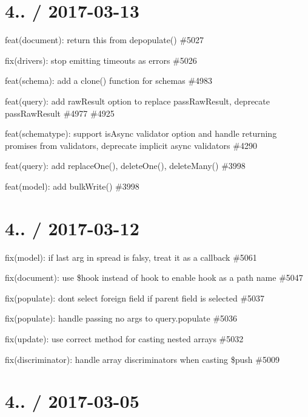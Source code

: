 \section*{4.. / 2017-\/03-\/13 }


\begin{DoxyItemize}
\item feat(document)\+: return this from {\ttfamily depopulate()} \#5027
\item fix(drivers)\+: stop emitting timeouts as errors \#5026
\item feat(schema)\+: add a clone() function for schemas \#4983
\item feat(query)\+: add raw\+Result option to replace pass\+Raw\+Result, deprecate pass\+Raw\+Result \#4977 \#4925
\item feat(schematype)\+: support is\+Async validator option and handle returning promises from validators, deprecate implicit async validators \#4290
\item feat(query)\+: add {\ttfamily replace\+One()}, {\ttfamily delete\+One()}, {\ttfamily delete\+Many()} \#3998
\item feat(model)\+: add {\ttfamily bulk\+Write()} \#3998
\end{DoxyItemize}

\section*{4.. / 2017-\/03-\/12 }


\begin{DoxyItemize}
\item fix(model)\+: if last arg in spread is falsy, treat it as a callback \#5061
\item fix(document)\+: use \$hook instead of hook to enable \textquotesingle{}hook\textquotesingle{} as a path name \#5047
\item fix(populate)\+: dont select foreign field if parent field is selected \#5037
\item fix(populate)\+: handle passing no args to query.\+populate \#5036
\item fix(update)\+: use correct method for casting nested arrays \#5032
\item fix(discriminator)\+: handle array discriminators when casting \$push \#5009
\end{DoxyItemize}

\section*{4.. / 2017-\/03-\/05 }


